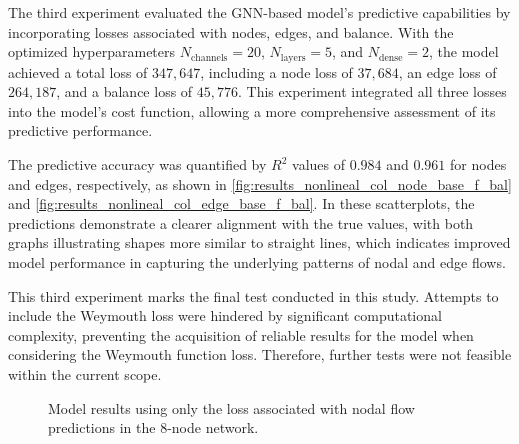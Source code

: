 The third experiment evaluated the GNN-based model's predictive capabilities by incorporating losses associated with nodes, edges, and balance. With the optimized hyperparameters \( N_{\text{channels}} = 20 \), \( N_{\text{layers}} = 5 \), and \( N_{\text{dense}} = 2 \), the model achieved a total loss of \( 347,647 \), including a node loss of \( 37,684 \), an edge loss of \( 264,187 \), and a balance loss of \( 45,776 \). This experiment integrated all three losses into the model's cost function, allowing a more comprehensive assessment of its predictive performance.

The predictive accuracy was quantified by \( R^2 \) values of \( 0.984 \) and \( 0.961 \) for nodes and edges, respectively, as shown in \cref{fig:results_nonlineal_col_node_base_f_bal} and \cref{fig:results_nonlineal_col_edge_base_f_bal}. In these scatterplots, the predictions demonstrate a clearer alignment with the true values, with both graphs illustrating shapes more similar to straight lines, which indicates improved model performance in capturing the underlying patterns of nodal and edge flows.

This third experiment marks the final test conducted in this study. Attempts to include the Weymouth loss were hindered by significant computational complexity, preventing the acquisition of reliable results for the model when considering the Weymouth function loss. Therefore, further tests were not feasible within the current scope.

\begin{figure}
    \centering
    \setlength{}        
    \setlength{} 
    
    \caption{Model results using only the loss associated with nodal flow predictions in the 8-node network.}
    \label{fig:col_base_f_bal_results_non_lineal}
\end{figure}



